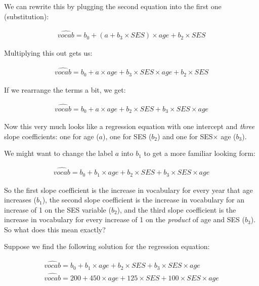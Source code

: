 We can rewrite this by plugging the second equation into the first one (substitution):

\begin{eqnarray}
\widehat{vocab} = b_0 + (a + b_3 \times SES)  \times age + b_2 \times SES 
\end{eqnarray}


Multiplying this out gets us:

\begin{eqnarray}
\widehat{vocab} = b_0 + a \times age + b_3 \times SES  \times age + b_2 \times SES
\end{eqnarray}

If we rearrange the terms a bit, we get:

\begin{eqnarray}
\widehat{vocab} = b_0 + a \times age + b_2 \times SES + b_3 \times SES  \times age
\end{eqnarray}

Now this very much looks like a regression equation with one intercept and \textit{three} slope coefficients: one for age ($a$), one for SES ($b_2$) and one for SES$\times$ age ($b_3$).


We might want to change the label $a$ into $b_1$ to get a more familiar looking form:

\begin{eqnarray}
\widehat{vocab} = b_0 + b_1\times age + b_2 \times SES + b_3 \times SES  \times age
\end{eqnarray}

So the first slope coefficient is the increase in vocabulary for every year that age increases ($b_1$), the second slope coefficient is the increase in vocabulary for an increase of 1 on the SES variable ($b_2$), and the third slope coefficient is the increase in vocabulary for every increase of 1 on the \textit{product} of age and SES ($b_3$).
\\
So what does this mean exactly?

% 
% 

Suppose we find the following solution for the regression equation:

\begin{eqnarray}
\widehat{vocab} = b_0 + b_1 \times age + b_2 \times SES + b_3 \times SES  \times age  \\
\widehat{vocab} = 200 + 450 \times age + 125 \times SES + 100 \times SES  \times age
\end{eqnarray}

